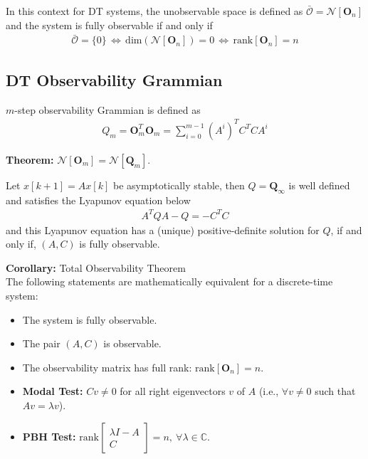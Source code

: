 \documentclass[twoside]{article}
\begin{document}
In this context for DT systems, the unobservable space is defined as $\bar{\mathcal{O}} = \mathcal{N}[ \mathbf{O}_n ]$
and the system is fully observable if and only if 
\begin{align*}
 \bar{\mathcal{O}} = \{0\} \, \iff \, \mathrm{dim}( \mathcal{N}[ \mathbf{O}_n ] ) = 0 \, \iff \,
 \mathrm{rank}[ \mathbf{O}_n ] = n
\end{align*}

\subsection{DT Observability Grammian}

$m$-step observability Grammian is defined as
\begin{align*}
 Q_m = \mathbf{O}_m^T \mathbf{O}_m = \sum\limits_{i=0}^{m-1} (A^i)^T C^T C A^i 
\end{align*}

\textbf{Theorem:} $\mathcal{N}[ \mathbf{O}_m ] = \mathcal{N}[ \mathbf{Q}_m ]$.

Let $x[k+1] = A x[k]$ be asymptotically stable, then $Q = \mathbf{Q}_{\infty}$ is well defined 
and satisfies the Lyapunov equation below
%
\begin{align*}
 A^T Q A - Q = - C^T C    
\end{align*}
%
and this Lyapunov equation has a (unique) positive-definite solution for $Q$,
if and only if, $(A,C)$ is fully observable.

\vspace{6pt}

\textbf{Corollary:} Total Observability Theorem \\
The following statements are mathematically equivalent for a discrete-time system:
\begin{itemize}
 \item The system is fully observable.
 \item The pair $(A,C)$ is observable.
 \item The observability matrix has full rank: $\mathrm{rank}[\mathbf{O}_n] = n$.
 \item \textbf{Modal Test:} $C v \neq 0$ for all right eigenvectors $v$ of $A$ (i.e., $\forall v \neq 0$ such that $A v = \lambda v$).
 \item \textbf{PBH Test:} $\mathrm{rank} \left[ \begin{array}{c} \lambda I - A \\ \hline C \end{array} \right] = n , \ \forall \lambda \in \mathbb{C}$.
\end{itemize}

\end{document}
